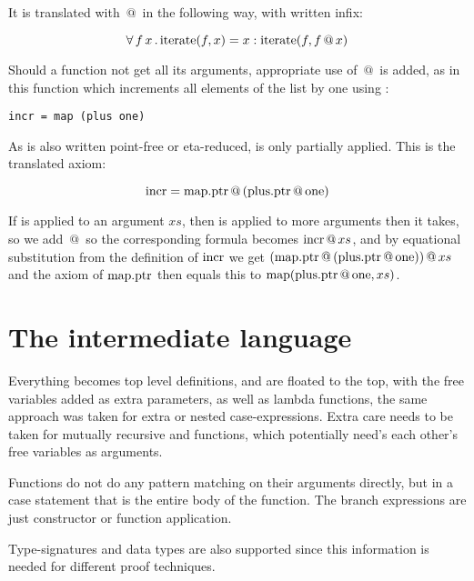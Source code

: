 It is translated with $\, @ \, $ in the following way, with \hs{:} written infix:

\begin{equation*}
\forall \, f \, x \, . \, \mathrm{iterate}(f,x) = x : \mathrm{iterate}(f,f \, @ \, x)
\end{equation*}

Should a function not get all its arguments, appropriate use of $\, @ \, $ is
added, as in this function which increments all elements of the list
by one using :

\begin{verbatim}
incr = map (plus one)
\end{verbatim}

As  is also written point-free or eta-reduced,  is
only partially applied. This is the translated axiom:

\begin{equation*}
\mathrm{incr} = \mathrm{map.ptr} \, @ \, (\mathrm{plus.ptr} \, @ \, \mathrm{one})
\end{equation*}

If  is applied to an argument $xs$, then  is applied
to more arguments then it takes, so we add $\, @ \,$ so the
corresponding formula becomes $\mathrm{incr} \, @ \, xs$, and by equational
substitution from the definition of $\mathrm{incr}$ we get
$(\mathrm{map.ptr} \, @ \, (\mathrm{plus.ptr} \, @ \, \mathrm{one})) \, @ \, xs$ and
the axiom of $\mathrm{map.ptr}$ then equals this to
$\mathrm{map}(\mathrm{plus.ptr} \, @ \, \mathrm{one},xs)$.

\section{The intermediate language}

Everything becomes top level definitions,  and  are
floated to the top, with the free variables added as extra parameters,
as well as lambda functions, the same approach was taken for extra or
nested case-expressions. Extra care needs to be taken for mutually
recursive  and  functions, which potentially need's
each other's free variables as arguments.

Functions do not do any pattern matching on their arguments directly,
but in a case statement that is the entire body of the function. The
branch expressions are just constructor or function application.

Type-signatures and data types are also supported since this
information is needed for different proof techniques.

